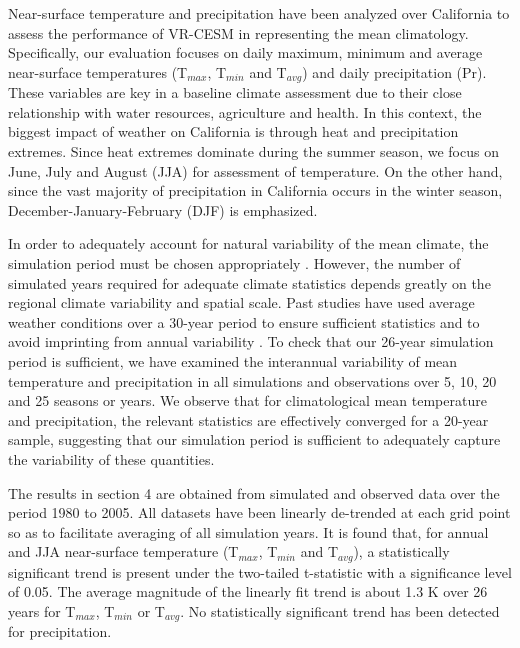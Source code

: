 \documentclass[draft,ms]{agutex}   %
\begin{document}
\begin{article}
Near-surface temperature and precipitation have been analyzed over California to assess the performance of VR-CESM in representing the mean climatology. Specifically, our evaluation focuses on daily maximum, minimum and average near-surface temperatures (T$_{max}$, T$_{min}$ and T$_{avg}$) and daily precipitation (Pr). These variables are key in a baseline climate assessment due to their close relationship with water resources, agriculture and health. In this context, the biggest impact of weather on California is through heat and precipitation extremes. Since heat extremes dominate during the summer season, we focus on June, July and August (JJA) for assessment of temperature. On the other hand, since the vast majority of precipitation in California occurs in the winter season, December-January-February (DJF) is emphasized.  

In order to adequately account for natural variability of the mean climate, the simulation period must be chosen appropriately \citep{solomon2007climate}. However, the number of simulated years required for adequate climate statistics depends greatly on the regional climate variability and spatial scale. Past studies have used average weather conditions over a 30-year period to ensure sufficient statistics and to avoid imprinting from annual variability \citep{dinse2009climate}. To check that our 26-year simulation period is sufficient, we have examined the interannual variability of mean temperature and precipitation in all simulations and observations over 5, 10, 20 and 25 seasons or years. We observe that for climatological mean temperature and precipitation, the relevant statistics are effectively converged for a 20-year sample, suggesting that our simulation period is sufficient to adequately capture the variability of these quantities.


The results in section 4 are obtained from simulated and observed data over the period 1980 to 2005.  All datasets have been linearly de-trended at each grid point so as to facilitate averaging of all simulation years. It is found that, for annual and JJA near-surface temperature (T$_{max}$, T$_{min}$ and T$_{avg}$), a statistically significant trend is present under the two-tailed t-statistic with a significance level of 0.05. The average magnitude of the linearly fit trend is about 1.3 K over 26 years for T$_{max}$, T$_{min}$ or T$_{avg}$. No statistically significant trend has been detected for precipitation.


\end{article}
\end{document}
